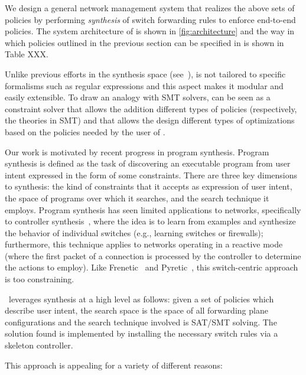 We design a general network management system that realizes the above
sets of policies by performing {\em synthesis} of switch forwarding
rules to enforce end-to-end policies. The system architecture of \name
is shown in \cref{fig:architecture} and the way in which policies
outlined in the previous section can be specified in \name is shown in
Table XXX.

Unlike previous efforts in the synthesis space (see~\cite{}), \Name is
not tailored to specific formalisms such as regular expressions and
this aspect makes it modular and easily extensible.
To draw an analogy with SMT solvers, \Name can be seen as a constraint
solver that allows the addition different types of policies
(respectively, the theories in SMT) and that allows the design
different types of optimizations based on the policies needed by the
user of \Name. 

Our work is motivated by recent progress in program synthesis.
Program synthesis is defined as the task of discovering an executable
program from user intent expressed in the form of some
constraints. There are three key dimensions to synthesis: the kind of
constraints that it accepts as expression of user intent, the space of
programs over which it searches, and the search technique it
employs. Program synthesis has seen limited applications to networks,
specifically to controller synthesis~\cite{netegg}, where the idea is
to learn from examples and synthesize the behavior of individual
switches (e.g., learning switches or firewalls); furthermore, this
technique applies to networks operating in a reactive mode (where the
first packet of a connection is processed by the controller to
determine the actions to employ). Like Frenetic~\cite{} and
Pyretic~\cite{}, this switch-centric approach is too constraining.

\Name\ leverages synthesis at a high level as follows: given a set of
policies which describe user intent, the search space is the space of
all forwarding plane configurations and the search technique involved
is SAT/SMT solving. The solution found is implemented by installing
the necessary switch rules via a skeleton controller.

This approach is appealing for a variety of different reasons: 

